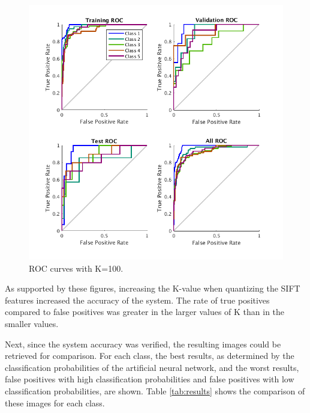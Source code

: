 \documentclass{article}
\begin{document}
\begin{figure}[h]
\centering
\includegraphics[scale=0.5]{Figures/Metrics/roc_k100}
\caption{ROC curves with K=100.}
\label{fig:r100}
\end{figure}
%

As supported by these figures, increasing the K-value when quantizing the SIFT features increased the accuracy of the system. The rate of true positives compared to false positives was greater in the larger values of K than in the smaller values.

Next, since the system accuracy was verified, the resulting images could be retrieved for comparison. For each class, the best results, as determined by the classification probabilities of the artificial neural network, and the worst results, false positives with high classification probabilities and false positives with low classification probabilities, are shown. Table \ref{tab:results} shows the comparison of these images for each class.
\end{document}
